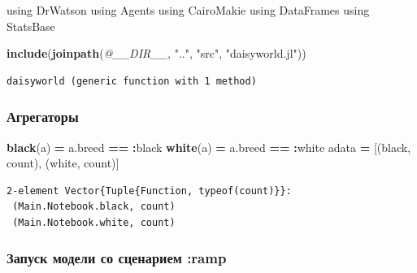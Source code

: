 \documentclass[
  english,
  russian,
  12pt,
  a4paper,
  DIV=11,
  numbers=noendperiod]{scrreprt}
\newenvironment{Shaded}{\begin{snugshade}}{\end{snugshade}}
\newcommand{\BuiltInTok}[1]{#1}
\newcommand{\FunctionTok}[1]{\textcolor[rgb]{0.13,0.29,0.53}{\textbf{#1}}}
\newcommand{\ImportTok}[1]{#1}
\newcommand{\NormalTok}[1]{#1}
\newcommand{\OperatorTok}[1]{\textcolor[rgb]{0.81,0.36,0.00}{\textbf{#1}}}
\newcommand{\PreprocessorTok}[1]{\textcolor[rgb]{0.56,0.35,0.01}{\textit{#1}}}
\newcommand{\StringTok}[1]{\textcolor[rgb]{0.31,0.60,0.02}{#1}}
\begin{document}
\begin{Shaded}
\begin{Highlighting}[]
\ImportTok{using} \BuiltInTok{DrWatson}
\ImportTok{using} \BuiltInTok{Agents}
\ImportTok{using} \BuiltInTok{CairoMakie}
\ImportTok{using} \BuiltInTok{DataFrames}
\ImportTok{using} \BuiltInTok{StatsBase}

\FunctionTok{include}\NormalTok{(}\FunctionTok{joinpath}\NormalTok{(}\PreprocessorTok{@\_\_DIR\_\_}\NormalTok{, }\StringTok{".."}\NormalTok{, }\StringTok{"src"}\NormalTok{, }\StringTok{"daisyworld.jl"}\NormalTok{))}
\end{Highlighting}
\end{Shaded}

\begin{verbatim}
daisyworld (generic function with 1 method)
\end{verbatim}

\subsubsection{Агрегаторы}\label{ux430ux433ux440ux435ux433ux430ux442ux43eux440ux44b}

\begin{Shaded}
\begin{Highlighting}[]
\FunctionTok{black}\NormalTok{(a) }\OperatorTok{=}\NormalTok{ a.breed }\OperatorTok{==} \OperatorTok{:}\NormalTok{black}
\FunctionTok{white}\NormalTok{(a) }\OperatorTok{=}\NormalTok{ a.breed }\OperatorTok{==} \OperatorTok{:}\NormalTok{white}
\NormalTok{adata }\OperatorTok{=}\NormalTok{ [(black, count), (white, count)]}
\end{Highlighting}
\end{Shaded}

\begin{verbatim}
2-element Vector{Tuple{Function, typeof(count)}}:
 (Main.Notebook.black, count)
 (Main.Notebook.white, count)
\end{verbatim}

\subsubsection{Запуск модели со сценарием
:ramp}\label{ux437ux430ux43fux443ux441ux43a-ux43cux43eux434ux435ux43bux438-ux441ux43e-ux441ux446ux435ux43dux430ux440ux438ux435ux43c-ramp}
\end{document}
